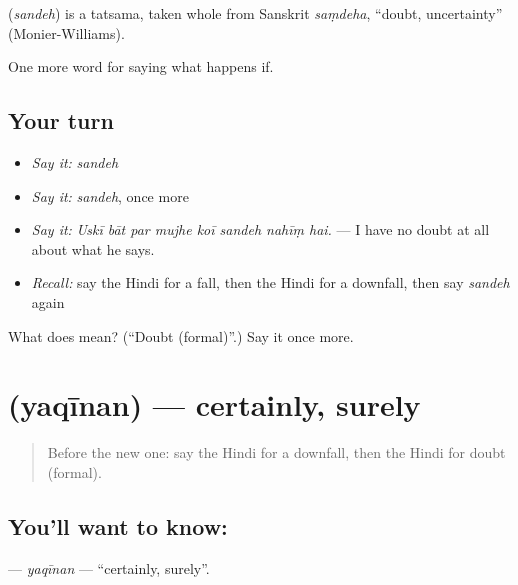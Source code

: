 \begin{cousinweb}
\textbf{} (\emph{sandeh}) is a tatsama, taken whole from Sanskrit \emph{saṃdeha}, \textquotedblleft{}doubt, uncertainty\textquotedblright{} (Monier-Williams).
\end{cousinweb}

\begin{grammarlens}[title={What you've built}]
One more word for saying what happens if.
\end{grammarlens}

\subsection*{Your turn}
\begin{itemize}
\raggedright
  \item \emph{Say it:} \emph{sandeh}
  \item \emph{Say it:} \emph{sandeh}, once more
  \item \emph{Say it:} \emph{Uskī bāt par mujhe koī sandeh nahīṃ hai.} — I have no doubt at all about what he says.
  \item \emph{Recall:} say the Hindi for a fall, then the Hindi for a downfall, then say \emph{sandeh} again
\end{itemize}

\begin{tcolorbox}[breakable,colback=teal!4,colframe=teal!35!black,title={Before you move on}]
What does  mean? (\textquotedblleft{}Doubt (formal)\textquotedblright{}.) Say it once more.
\end{tcolorbox}
\section[\texorpdfstring{\hi{यक़ीनन} (yaqīnan)}{यक़ीनन (yaqīnan)}]{ (yaqīnan) — certainly, surely}

\label{lesson:HI-C556-yaqinan}



\begin{quote}
Before the new one: say the Hindi for a downfall, then the Hindi for doubt (formal).
\end{quote}

\subsection*{You'll want to know: }
\textbf{} — \emph{yaqīnan} — \textquotedblleft{}certainly, surely\textquotedblright{}.

